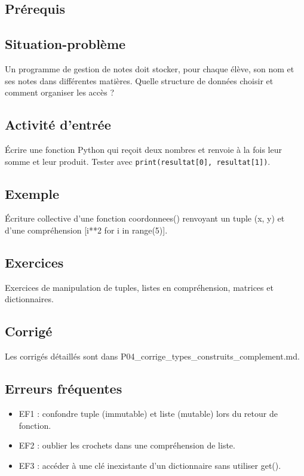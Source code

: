 \subsection{Prérequis}

\subsection{Situation-problème}

Un programme de gestion de notes doit stocker, pour chaque élève, son
nom et ses notes dans différentes matières. Quelle structure de données
choisir et comment organiser les accès ?

\subsection{Activité d’entrée}

Écrire une fonction Python qui reçoit deux nombres et renvoie à la fois
leur somme et leur produit. Tester avec \lstinline|print(resultat[0], resultat[1])|.

\subsection{Exemple}

Écriture collective d'une fonction coordonnees() renvoyant un tuple (x,
y) et d'une compréhension {[}i**2 for i in range(5){]}.

\subsection{Exercices}

Exercices de manipulation de tuples, listes en compréhension, matrices
et dictionnaires.

\subsection{Corrigé}

Les corrigés détaillés sont dans
P04\_corrige\_types\_construits\_complement.md.

\subsection{Erreurs fréquentes}

\begin{itemize}
\tightlist
\item
  EF1 : confondre tuple (immutable) et liste (mutable) lors du retour de
  fonction.
\item
  EF2 : oublier les crochets dans une compréhension de liste.
\item
  EF3 : accéder à une clé inexistante d'un dictionnaire sans utiliser
  get().
\end{itemize}

